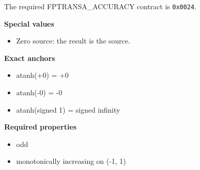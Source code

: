 The required FPTRANSA\_ACCURACY contract is \texttt{0x0024}.

\textbf{Special values}\par
\begin{itemize}
\item Zero source: the result is the source.
\end{itemize}

\textbf{Exact anchors}\par
\begin{itemize}
\item atanh(+0) = +0
\item atanh(-0) = -0
\item atanh(signed 1) = signed infinity
\end{itemize}

\textbf{Required properties}\par
\begin{itemize}
\item odd
\item monotonically increasing on (-1, 1)
\end{itemize}
